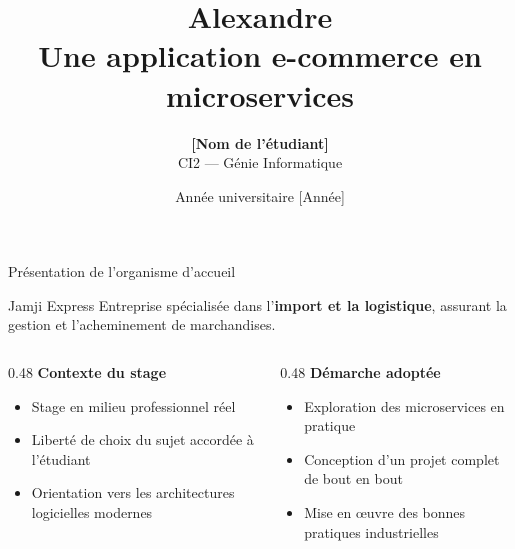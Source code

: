 \documentclass[aspectratio=169]{beamer}
\title[Alexandre — PFA]%
      {\textbf{Alexandre}\\[4pt]
       \large Une application e-commerce en microservices}
\author[Nom de l'étudiant]{%
  \textbf{[Nom de l'étudiant]}\\[4pt]
  \small CI2 — Génie Informatique
}
\institute[Jamji Express]{%
  Projet de Fin d'Année\\[2pt]
  Entreprise d'accueil : \textbf{Jamji Express}
}
\date{Année universitaire [Année]}
\begin{document}

\begin{frame}[plain]
  \titlepage
\end{frame}

\begin{frame}{Présentation de l'organisme d'accueil}

  \begin{block}{\faBuilding\quad Jamji Express}
    Entreprise spécialisée dans l'\textbf{import et la logistique},
    assurant la gestion et l'acheminement de marchandises.
  \end{block}

  \vspace{1em}

  \begin{columns}[T]
    \begin{column}{0.48\textwidth}
      \textbf{\color{primary}Contexte du stage}
      \begin{itemize}
        \item Stage en milieu professionnel réel
        \item Liberté de choix du sujet accordée à l'étudiant
        \item Orientation vers les \alert{architectures logicielles modernes}
      \end{itemize}
    \end{column}
    \begin{column}{0.48\textwidth}
      \textbf{\color{primary}Démarche adoptée}
      \begin{itemize}
        \item Exploration des \alert{microservices} en pratique
        \item Conception d'un projet complet de bout en bout
        \item Mise en œuvre des bonnes pratiques industrielles
      \end{itemize}
    \end{column}
  \end{columns}

\end{frame}
\end{document}
